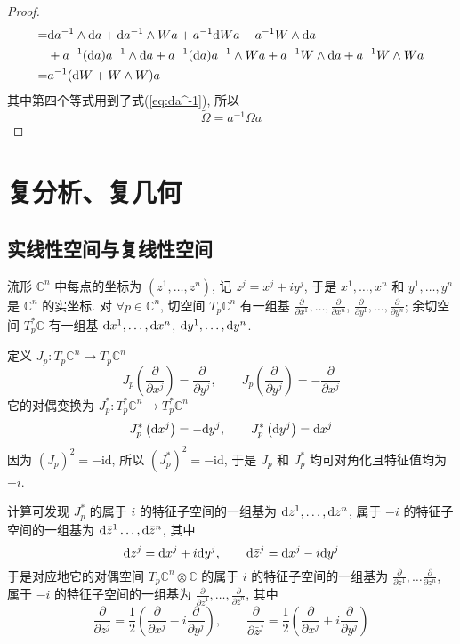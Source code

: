 \documentclass{book}
\newcommand{\md}{{\rm d}}
\newcommand{\pd}[2]{\frac{\partial #1}{\partial #2}}
\begin{document}
\begin{proof}
\begin{align*}
                    =& \md a^{-1}\wedge\md a + \md a^{-1}\wedge Wa + a^{-1}\md Wa - a^{-1}W\wedge\md a \\
                    &+ a^{-1}(\md a)a^{-1}\wedge\md a + a^{-1}(\md a)a^{-1}\wedge Wa + a^{-1}W\wedge\md a + a^{-1}W\wedge Wa \\
                    =& a^{-1}(\md W + W\wedge W)a
                \end{align*}
                其中第四个等式用到了式(\ref{eq:da^-1}), 所以
                \begin{equation*}
                    \tilde{\Omega} = a^{-1}\Omega a
                \end{equation*}
            \end{proof}
            
    \chapter{复分析、复几何}
    \section{实线性空间与复线性空间}
        流形 $\mathbb{C}^n$ 中每点的坐标为 $(z^1,\dots,z^n)$, 记 $z^j=x^j+iy^j$, 于是 $x^1,\dots,x^n$ 和 $y^1,\dots,y^n$ 是 $\mathbb{C}^n$ 的实坐标.
        对 $\forall p\in\mathbb{C}^n$, 切空间 $T_p\mathbb{C}^n$ 有一组基 $\pd{}{x^1},\dots,\pd{}{x^n}$, $\pd{}{y^1},\dots,\pd{}{y^n}$; 余切空间 $T^*_p\mathbb{C}$
        有一组基 $\md x^1,\dots,\md x^n$, $\md y^1,\dots,\md y^n$.

        定义 $J_p:T_p\mathbb{C}^n\rightarrow T_p\mathbb{C}^n$
        \begin{equation*}
            J_p\left(\pd{}{x^j}\right)=\pd{}{y^j},\qquad J_p\left(\pd{}{y^j}\right)=-\pd{}{x^j}
        \end{equation*}
        它的对偶变换为 $J^*_p:T^*_p\mathbb{C}^n\rightarrow T^*_p\mathbb{C}^n$
        \begin{equation*}
            J^*_p\left(\md x^j\right)=-\md{y^j},\qquad J^*_p\left(\md{y^j}\right)=\md{x^j}
        \end{equation*}
        因为 $(J_p)^2=-\mathrm{id}$, 所以 $(J^*_p)^2=-\mathrm{id}$, 于是 $J_p$ 和 $J^*_p$ 均可对角化且特征值均为 $\pm i$.

        计算可发现 $J^*_p$ 的属于 $i$ 的特征子空间的一组基为 $\md{z^1},\dots,\md{z^n}$, 属于 $-i$ 的特征子空间的一组基为 $\md{\bar{z}^1}\dots,\md{\bar{z}^n}$, 其中
        \begin{equation*}
            \md{z^j}=\md{x^j}+i\md{y^j},\qquad \md{\bar{z}^j}=\md{x^j}-i\md{y^j}
        \end{equation*}
        于是对应地它的对偶空间 $T_p\mathbb{C}^n\otimes\mathbb{C}$ 的属于 $i$ 的特征子空间的一组基为 $\pd{}{z^1},\dots\pd{}{z^n}$, 属于 $-i$ 的特征子空间的一组基为 $\pd{}{\bar{z}^1},\dots,\pd{}{\bar{z}^n}$, 其中
        \begin{equation*}
            \pd{}{z^j}=\frac{1}{2}\left(\pd{}{x^j}-i\pd{}{y^j}\right),\qquad \pd{}{\bar{z}^j}=\frac{1}{2}\left(\pd{}{x^j}+i\pd{}{y^j}\right)
        \end{equation*}
        
\end{document}
